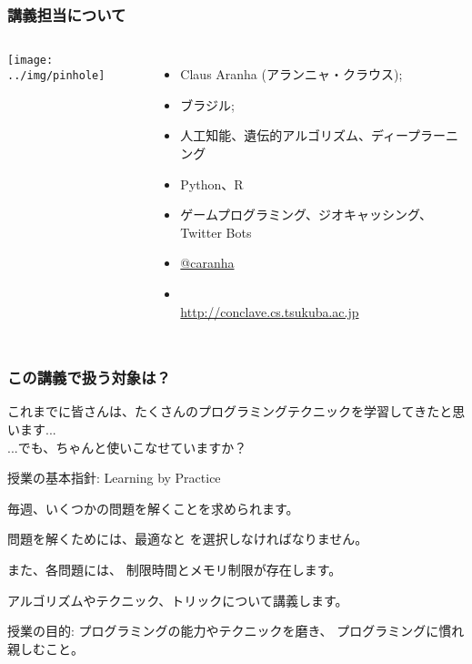 \documentclass{beamer}
\begin{document}
\begin{frame}
  \frametitle{講義担当について}
  \begin{columns}
    \texttt{[image: ../img/pinhole]}
    {\small
    \begin{itemize}
      \item {} Claus Aranha (アランニャ・クラウス);
      \item {} ブラジル;
        
        \medskip

      \item {} 人工知能、遺伝的アルゴリズム、ディープラーニング
      \item {} Python、R
      \item {} ゲームプログラミング、ジオキャッシング、Twitter
        Bots
        
        \medskip

      \item {} \href{http://www.twitter.com/caranha}{@caranha}
      \item {}\\ {\smaller \url{http://conclave.cs.tsukuba.ac.jp}}
    \end{itemize}
    }
  \end{columns}
\end{frame}

\begin{frame}
  \frametitle{この講義で扱う対象は？}
  
  これまでに皆さんは、たくさんのプログラミングテクニックを学習してきたと思います...\\\hfill ...でも、ちゃんと使いこなせていますか？

  \begin{block}{授業の基本指針: Learning by Practice}
    \begin{itemize}
      {\small
    \item 毎週、いくつかの問題を解くことを求められます。
    \item 問題を解くためには、最適なと
      を選択しなければなりません。
    \item また、各問題には、 \alert{制限時間}と\alert{メモリ制限}が存在します。
    \item アルゴリズムやテクニック、トリックについて講義します。
      }
    \end{itemize}
  \end{block}

  \begin{exampleblock}{授業の目的:}
    プログラミングの能力やテクニックを磨き、
    プログラミングに慣れ親しむこと。
  \end{exampleblock}
\end{frame}
\end{document}
